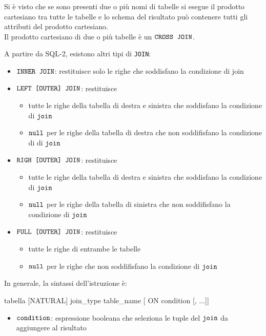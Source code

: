 Si è visto che se sono presenti due o più nomi di tabelle si esegue il prodotto cartesiano tra tutte le tabelle e lo schema del risultato
può contenere tutti gli attributi del prodotto cartesiano.\\[0.2ex]
Il prodotto cartesiano di due o più tabelle è un $\verb|CROSS JOIN|$.

\medskip
A partire da SQL-2, esistono altri tipi di \texttt{JOIN}:
\begin{itemize}[label=$\circ$, itemsep=\medskipamount]
  \item $\verb|INNER JOIN|$: restituisce solo le righe che soddisfano la condizione di join
  \item $\verb|LEFT [OUTER] JOIN|$: restituisce
  \begin{itemize}[label=$\diamond$, itemsep=\smallskipamount]
    \item tutte le righe della tabella di destra e sinistra che soddisfano la condizione di $\verb|join|$
    \item $\verb|null|$ per le righe della tabella di destra che non soddifisfano la condizione di di $\verb|join|$
  \end{itemize}
  \item $\verb|RIGH [OUTER] JOIN|$: restituisce
  \begin{itemize}[label=$\diamond$, itemsep=\smallskipamount]
    \item tutte le righe della tabella di destra e sinistra che soddisfano la condizione di $\verb|join|$
    \item $\verb|null|$ per le righe della tabella di sinistra che non soddifisfano la condizione di $\verb|join|$
  \end{itemize}
  \item $\verb|FULL [OUTER] JOIN|$: restituisce
  \begin{itemize}[label=$\diamond$, itemsep=\smallskipamount]
    \item tutte le righe di entrambe le tabelle
    \item $\verb|null|$ per le righe che non soddifisfano la condizione di $\verb|join|$
  \end{itemize}
\end{itemize}

In generale, la sintassi dell'istruzione è:
\begin{codiceSQL}
tabella [NATURAL] join_type table_name [ ON condition [, ...]]
\end{codiceSQL}

\begin{itemize}[label=$\triangleright$]
  \item $\verb|condition|$: espressione booleana che seleziona le tuple del $\verb|join|$ da aggiungere al risultato
\end{itemize}

